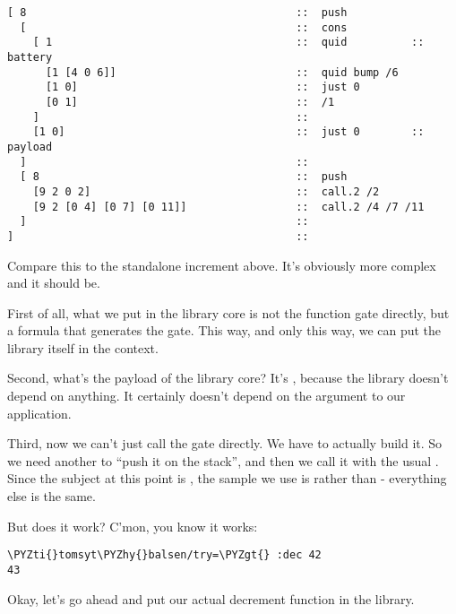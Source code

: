 \begin{framed_shaded}
\begin{Verbatim}[fontsize=\relsize{-2.5},fontseries=b,commandchars=\\\{\}]
[ 8                                          ::  push
  [                                          ::  cons
    [ 1                                      ::  quid          ::  battery
      [1 [4 0 6]]                            ::  quid bump /6
      [1 0]                                  ::  just 0
      [0 1]                                  ::  /1
    ]                                        ::
    [1 0]                                    ::  just 0        ::  payload
  ]                                          ::  
  [ 8                                        ::  push
    [9 2 0 2]                                ::  call.2 /2
    [9 2 [0 4] [0 7] [0 11]]                 ::  call.2 /4 /7 /11
  ]                                          ::
]                                            ::
\end{Verbatim}
\end{framed_shaded}
Compare this to the standalone increment above.  It's obviously
more complex and it should be.

First of all, what we put in the library core is not the function
gate directly, but a formula that generates the gate.  This way,
and only this way, we can put the library itself in the context.

Second, what's the payload of the library core?  It's ,
because the library doesn't depend on anything.  It certainly
doesn't depend on the argument to our application.

Third, now we can't just call the gate directly.  We have to
actually build it.  So we need another  to ``push it on the
stack'', and then we call it with the usual .  Since the
subject at this point is , the sample we
use is \kode{[0 7]} rather than \kode{[0 3]} - everything else is the same.

But does it work?  C'mon, you know it works:

\begin{framed_shaded}
\begin{Verbatim}[fontsize=\relsize{-2.5},fontseries=b,commandchars=\\\{\}]
\PYZti{}tomsyt\PYZhy{}balsen/try=\PYZgt{} :dec 42
43
\end{Verbatim}
\end{framed_shaded}
Okay, let's go ahead and put our actual decrement function in
the library.

